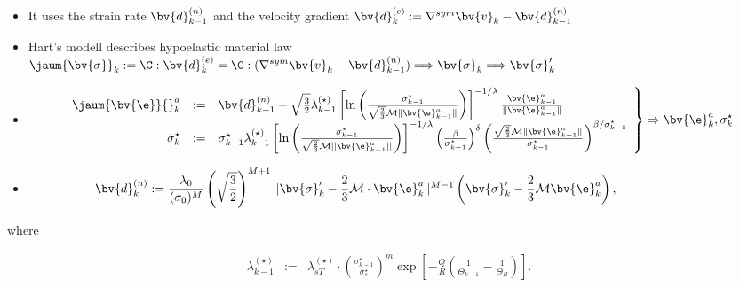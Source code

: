 \begin{minipage}[c]{13cm}
\begin{itemize}
\item It uses the strain rate $\bv{d}^{(n)}_{k-1}$ and the velocity gradient $\bv{d}^{(e)}_{k}:=\nabla^{sym} \bv{v}_{k}-\bv{d}^{(n)}_{k-1}$
\item Hart's modell describes hypoelastic material law $\displaystyle\jaum{\bv{\sigma}}_{k}:=\C:\bv{d}^{(e)}_k=\C:(\nabla^{sym} \bv{v}_{k}-\bv{d}^{(n)}_{k-1})\Longrightarrow \bv{\sigma}_{k}\Longrightarrow \bv{\sigma}'_{k}$

\item 
\begin{equation*}
\left.
\begin{array}{rcl}
\displaystyle\jaum{\bv{\e}}{}^{a}_{k}
&:=&\bv{d}^{(n)}_{k-1}-\sqrt{\frac{3}{2}}\lambda^{(\star)}_{k-1}\left[\ln\left( \frac{\sigma^{\star}_{k-1}}{\sqrt{\frac{2}{3}}\mathcal{M}\|\bv{\e}^{a}_{k-1}\|}\right)  \right]^{-1/\lambda}\frac{\bv{\e}^{a}_{k-1}}{\|\bv{\e}^{a}_{k-1}\|}
\\
\displaystyle\dot{\sigma}^{\star}_{k}&:=&\sigma^{\star}_{k-1}\lambda^{(\star)}_{k-1}\left[\ln\left( \frac{\sigma^{\star}_{k-1}}{\sqrt{\frac{2}{3}}\mathcal{M}\vert\vert\bv{\e}^{a}_{k-1}\vert\vert}\right)  \right]^{-1/\lambda}\left( \frac{\beta}{\sigma^{\star}_{k-1}}\right) ^{\delta}\left(\frac{\sqrt{\frac{2}{3}}\mathcal{M}\|\bv{\e}^{a}_{k-1}\|}{\sigma^{\star}_{k-1}} \right) ^{\beta/\sigma^{\star}_{k-1}}
\end{array}
\right\}
\Rightarrow \bv{\e}^{a}_{k}, \sigma^{\star}_{k}
\end{equation*} 

\item
\begin{equation*}
\hspace*{-25mm}\bv{d}^{(n)}_{k}
:=\frac{\lambda_{0}}{(\sigma_{0})^{M}}\left( \sqrt{\frac{3}{2}}\right)^{M+1} \|\bv{\sigma}'_{k}-\frac{2}{3}\mathcal{M}\cdot\bv{\e}^{a}_{k}\|^{M-1}\left( \bv{\sigma}'_{k}-\frac{2}{3}\mathcal{M}\bv{\e}^{a}_{k}\right),\nonumber
\end{equation*} 

\end{itemize}
where

\begin{eqnarray}\lambda^{(\star)}_{k-1}&:=&\lambda_{sT}^{(\star)}\cdot\left( \frac{\sigma^{\star}_{k-1}}{\sigma_{s}^{\star}}\right)^{m}\exp\left[ -\frac{Q}{R}\left( \frac{1}{\Theta_{k-1}}-\frac{1}{\Theta_{B}}\right) \right].\nonumber
\end{eqnarray} 
\end{minipage}

